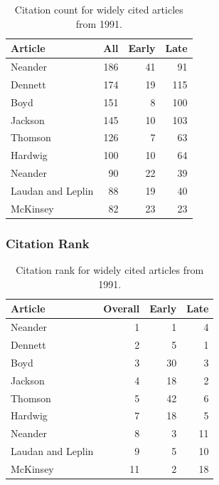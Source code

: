 \documentclass[
  10pt,
  letterpaper,
  DIV=11,
  numbers=noendperiod,
  twoside]{scrartcl}
\begin{document}
\begin{longtable}[]{@{}lrrr@{}}

\caption{\label{tbl-citation-count-1991}Citation count for widely cited
articles from 1991.}

\tabularnewline

\toprule\noalign{}
Article & All & Early & Late \\
\midrule\noalign{}
\endhead
\bottomrule\noalign{}
\endlastfoot
Neander & 186 & 41 & 91 \\
Dennett & 174 & 19 & 115 \\
Boyd & 151 & 8 & 100 \\
Jackson & 145 & 10 & 103 \\
Thomson & 126 & 7 & 63 \\
Hardwig & 100 & 10 & 64 \\
Neander & 90 & 22 & 39 \\
Laudan and Leplin & 88 & 19 & 40 \\
McKinsey & 82 & 23 & 23 \\

\end{longtable}

\subsubsection*{Citation Rank}\label{sec-rank-1991}

\begin{longtable}[]{@{}lrrr@{}}

\caption{\label{tbl-citation-rank-1991}Citation rank for widely cited
articles from 1991.}

\tabularnewline

\toprule\noalign{}
Article & Overall & Early & Late \\
\midrule\noalign{}
\endhead
\bottomrule\noalign{}
\endlastfoot
Neander & 1 & 1 & 4 \\
Dennett & 2 & 5 & 1 \\
Boyd & 3 & 30 & 3 \\
Jackson & 4 & 18 & 2 \\
Thomson & 5 & 42 & 6 \\
Hardwig & 7 & 18 & 5 \\
Neander & 8 & 3 & 11 \\
Laudan and Leplin & 9 & 5 & 10 \\
McKinsey & 11 & 2 & 18 \\

\end{longtable}
\end{document}
